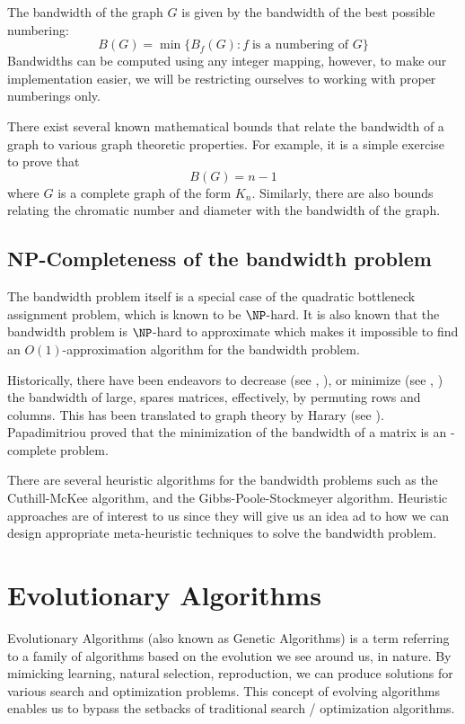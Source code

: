\documentclass[conference,compsoc]{IEEEtran}
\begin{document}
The bandwidth of the graph $G$ is given by the bandwidth of the best possible numbering:
\begin{equation}
  B(G) = \min \{B_f(G): f \; \text{is a numbering of }  G\}
\end{equation}
Bandwidths can be computed using any integer mapping, however, to make our implementation 
easier, we will be restricting ourselves to working with proper numberings only.

There exist several known mathematical bounds that relate the bandwidth of a graph 
to various graph theoretic properties. For example, it is a simple exercise to prove that 
\[B(G) = n - 1\] where $G$ is a complete graph of the form $K_n$. Similarly, there are also bounds 
relating the chromatic number and diameter with the bandwidth of the graph.  \cite{ccdg1982}

\subsection{NP-Completeness of the bandwidth problem} \label{npp}

The bandwidth problem itself is a special case of the quadratic bottleneck assignment problem, which is known to be 
$\NP$-hard. It is also known that the bandwidth problem is $\NP$-hard to approximate which makes it impossible to find 
an $O(1)$-approximation algorithm for the bandwidth problem. 

Historically, there have been endeavors to decrease (see \cite{10.1145/800195.805928}, \cite{sparse}), or minimize 
(see \cite{chen}, \cite{chen2}) 
the bandwidth of large, spares matrices, effectively, by permuting rows and columns. 
This has been translated to graph theory by Harary (see \cite{1973141}). 
Papadimitriou proved that the minimization of the bandwidth of a matrix is an 
\NP-complete problem. \cite{papadimitriou_1976}

There are several heuristic algorithms for the bandwidth problems such as the Cuthill-McKee algorithm, and the 
Gibbs-Poole-Stockmeyer algorithm. Heuristic approaches are of interest to us since they will give us an 
idea ad to how we can design appropriate meta-heuristic techniques to solve the bandwidth problem. 

\section{Evolutionary Algorithms}
Evolutionary Algorithms (also known as Genetic Algorithms) is a term referring to a 
family of algorithms based on the evolution we see around us, in nature. By mimicking learning, 
natural selection, reproduction, we can produce solutions for various search and optimization problems. 
This concept of evolving algorithms enables us to bypass the setbacks of traditional search / optimization algorithms.
\end{document}
